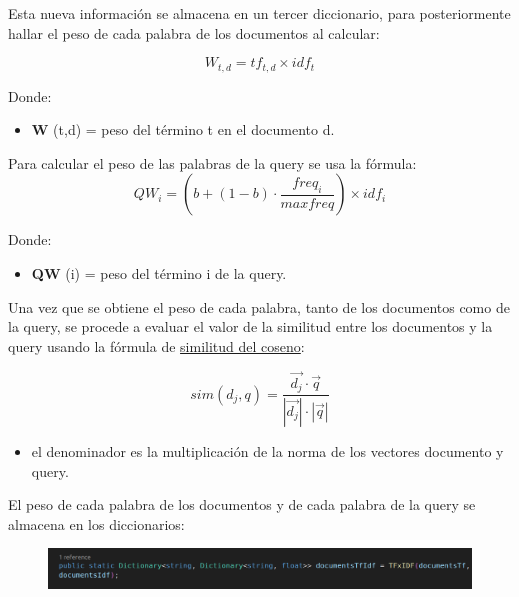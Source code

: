 \documentclass[12 pt]{article}
\begin{document}
\vspace{0.5 cm}
Esta nueva información se almacena en un tercer diccionario, para posteriormente hallar el peso de cada palabra de los documentos al calcular:

\begin{equation}
    W_{t,d} = tf_{t,d} \times idf_t
\end{equation}

Donde:
\begin{itemize}
    \item \small \textbf{W} (t,d) = peso del término t en el documento d.
\end{itemize}
 \vspace{1 cm}
   Para calcular el peso de las palabras de la query se usa la fórmula: 
 \begin{equation}
    QW_i = (b+(1-b)\cdot \frac{f req_i}{maxf req}) \times idf_i
 \end{equation}

 Donde:
 \begin{itemize}
  \item \small \textbf{QW} (i) = peso del término i de la query. 
 \end{itemize}
 \vspace{0.5 cm}

  Una vez que se obtiene el peso de cada palabra, tanto de los documentos
 como de la query, se procede a evaluar el valor de la similitud entre los
 documentos y la query usando la fórmula de \underline{similitud del coseno}:

 \begin{equation}
    sim(d_j,q) = \frac{\vec{d_j} \cdot \vec{q}}{|\vec{d_j}| \cdot |\vec{q}|}
 \end{equation}

 \begin{center}
    \begin{itemize}
       \item \small el denominador es la multiplicaci\'on de la norma de los vectores documento y query.
    \end{itemize}
 \end{center}

   El peso de cada palabra de los documentos y de cada palabra de la query se almacena en los diccionarios:\
   \newline
\begin{figure}[h]
    \includegraphics[width=1 \linewidth]{tfIdf.png}
\end{figure}
\end{document}
